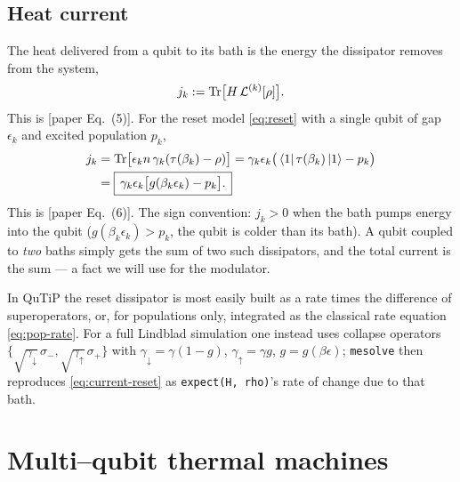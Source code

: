 \documentclass[11pt,a4paper]{article}
\newcommand{\calL}{\mathcal{L}}
\theoremstyle{definition}
\theoremstyle{remark}
\begin{document}
\subsection{Heat current}
The heat delivered from a qubit to its bath is the energy the dissipator
removes from the system,
\begin{equation}
j_k := \Tr\!\big[H\,\calL^{(k)}[\rho]\big].
\label{eq:current-def}
\end{equation}
This is [paper Eq.~(5)]. For the reset model \eqref{eq:reset} with a
single qubit of gap $\epsilon_k$ and excited population $p_k$,
\begin{align}
j_k
&= \Tr\!\big[\epsilon_k n\,\gamma_k(\tau(\beta_k)-\rho)\big]
= \gamma_k\epsilon_k\big(\bra{1}\tau(\beta_k)\ket{1} - p_k\big)
\nonumber\\
&= \boxed{\,\gamma_k\epsilon_k\big[g(\beta_k\epsilon_k) - p_k\big].\,}
\label{eq:current-reset}
\end{align}
This is [paper Eq.~(6)]. The sign convention: $j_k>0$ when the bath
pumps energy into the qubit ($g(\beta_k\epsilon_k)>p_k$, the qubit is
colder than its bath). A qubit coupled to \emph{two} baths simply gets
the sum of two such dissipators, and the total current is the sum ---
a fact we will use for the modulator.

\begin{implbox}
In QuTiP the reset dissipator is most easily built as a rate times the
difference of superoperators, or, for populations only, integrated as
the classical rate equation \eqref{eq:pop-rate}. For a full Lindblad
simulation one instead uses collapse operators
$\{\sqrt{\gamma_\downarrow}\,\sigma_-,\sqrt{\gamma_\uparrow}\,\sigma_+\}$
with $\gamma_\downarrow=\gamma(1-g)$, $\gamma_\uparrow=\gamma g$,
$g=g(\beta\epsilon)$; \texttt{mesolve} then reproduces
\eqref{eq:current-reset} as
\texttt{expect(H, rho)}'s rate of change due to that bath.
\end{implbox}

\section{Multi--qubit thermal machines}
\label{sec:machine}
\end{document}
